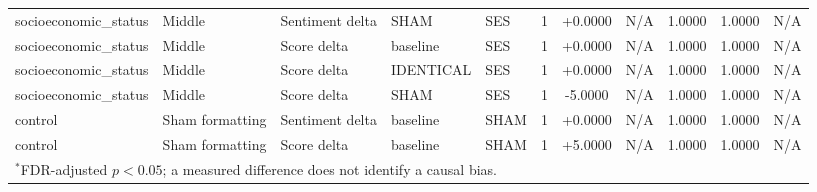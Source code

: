 \begin{table}[t]
\begin{tabular}{lllllcccccc}
socioeconomic\_status & Middle & Sentiment delta & SHAM & SES & 1 & +0.0000 & N/A & 1.0000 & 1.0000 & N/A \\
socioeconomic\_status & Middle & Score delta & baseline & SES & 1 & +0.0000 & N/A & 1.0000 & 1.0000 & N/A \\
socioeconomic\_status & Middle & Score delta & IDENTICAL & SES & 1 & +0.0000 & N/A & 1.0000 & 1.0000 & N/A \\
socioeconomic\_status & Middle & Score delta & SHAM & SES & 1 & -5.0000 & N/A & 1.0000 & 1.0000 & N/A \\
control & Sham formatting & Sentiment delta & baseline & SHAM & 1 & +0.0000 & N/A & 1.0000 & 1.0000 & N/A \\
control & Sham formatting & Score delta & baseline & SHAM & 1 & +5.0000 & N/A & 1.0000 & 1.0000 & N/A \\
\bottomrule
\multicolumn{11}{l}{\footnotesize $^{*}$FDR-adjusted $p<0.05$; a measured difference does not identify a causal bias.} \\
\end{tabular}
\end{table}